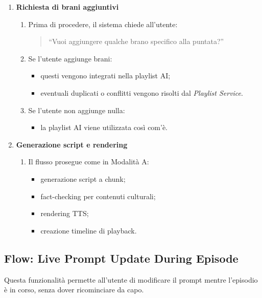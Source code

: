 \documentclass[11pt,a4paper]{article}
\begin{document}
\begin{enumerate}
    \item \textbf{Richiesta di brani aggiuntivi}
    \begin{enumerate}
        \item Prima di procedere, il sistema chiede all'utente:
        \begin{quote}
            ``Vuoi aggiungere qualche brano specifico alla puntata?''
        \end{quote}
        \item Se l'utente aggiunge brani:
        \begin{itemize}
            \item questi vengono integrati nella playlist AI;
            \item eventuali duplicati o conflitti vengono risolti dal \textit{Playlist Service}.
        \end{itemize}
        \item Se l'utente non aggiunge nulla:
        \begin{itemize}
            \item la playlist AI viene utilizzata così com'è.
        \end{itemize}
    \end{enumerate}

    \item \textbf{Generazione script e rendering}
    \begin{enumerate}
        \item Il flusso prosegue come in Modalità A:
        \begin{itemize}
            \item generazione script a chunk;
            \item fact-checking per contenuti culturali;
            \item rendering TTS;
            \item creazione timeline di playback.
        \end{itemize}
    \end{enumerate}
\end{enumerate}


\subsection{Flow: Live Prompt Update During Episode}

Questa funzionalità permette all'utente di modificare il prompt mentre l'episodio è in corso, senza dover ricominciare da capo.
\end{document}
